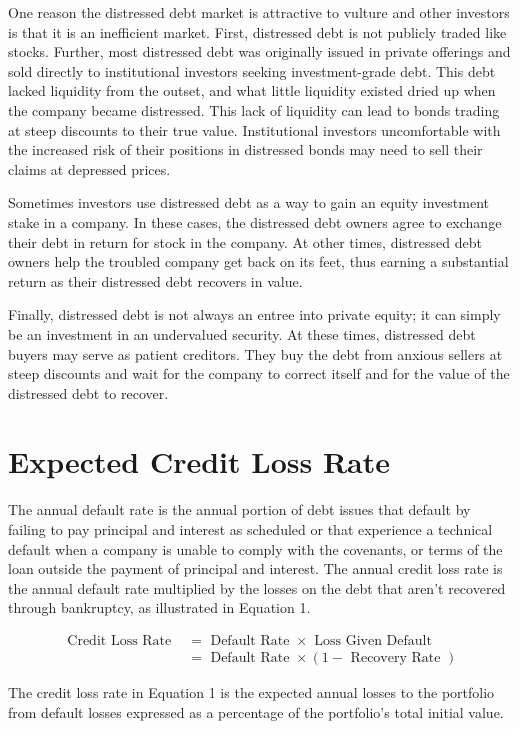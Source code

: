\documentclass[11pt]{article}
\begin{document}
One reason the distressed debt market is attractive to vulture and other investors is that it is an inefficient market. First, distressed debt is not publicly traded like stocks. Further, most distressed debt was originally issued in private offerings and sold directly to institutional investors seeking investment-grade debt. This debt lacked liquidity from the outset, and what little liquidity existed dried up when the company became distressed. This lack of liquidity can lead to bonds trading at steep discounts to their true value. Institutional investors uncomfortable with the increased risk of their positions in distressed bonds may need to sell their claims at depressed prices.

Sometimes investors use distressed debt as a way to gain an equity investment stake in a company. In these cases, the distressed debt owners agree to exchange their debt in return for stock in the company. At other times, distressed debt owners help the troubled company get back on its feet, thus earning a substantial return as their distressed debt recovers in value.

Finally, distressed debt is not always an entree into private equity; it can simply be an investment in an undervalued security. At these times, distressed debt buyers may serve as patient creditors. They buy the debt from anxious sellers at steep discounts and wait for the company to correct itself and for the value of the distressed debt to recover.

\section*{Expected Credit Loss Rate}
The annual default rate is the annual portion of debt issues that default by failing to pay principal and interest as scheduled or that experience a technical default when a company is unable to comply with the covenants, or terms of the loan outside the payment of principal and interest. The annual credit loss rate is the annual default rate multiplied by the losses on the debt that aren't recovered through bankruptcy, as illustrated in Equation 1.


\begin{align*}
\text { Credit Loss Rate } & =\text { Default Rate } \times \text { Loss Given Default } \\
& =\text { Default Rate } \times(1-\text { Recovery Rate }) \tag{1}
\end{align*}


The credit loss rate in Equation 1 is the expected annual losses to the portfolio from default losses expressed as a percentage of the portfolio's total initial value.
\end{document}
